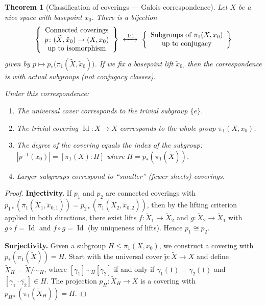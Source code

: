 \documentclass[12pt,a4paper,openany]{book}
\theoremstyle{definition}
\theoremstyle{plain}
\newtheorem{theorem}[definition]{Theorem}
\theoremstyle{remark}
\DeclareMathOperator{\Id}{Id}
\newcommand{\abs}[1]{\left|#1\right|}
\begin{document}
\begin{theorem}[Classification of coverings --- Galois correspondence]\label{thm:galois-correspondence}
  Let $X$ be a nice space with basepoint $x_0$.  There is a bijection
  \[
    \left\{
    \begin{array}{c}
      \text{Connected coverings}\\
      p\colon (\widetilde{X}, \tilde{x}_0) \to (X, x_0)\\
      \text{up to isomorphism}
    \end{array}
    \right\}
    \;\xleftrightarrow{\;1:1\;}\;
    \left\{
    \begin{array}{c}
      \text{Subgroups of } \pi_1(X, x_0)\\
      \text{up to conjugacy}
    \end{array}
    \right\}
  \]
  given by $p \mapsto p_*\big(\pi_1(\widetilde{X}, \tilde{x}_0)\big)$.
  If we fix a basepoint lift $\tilde{x}_0$, then the correspondence is with
  actual subgroups (not conjugacy classes).

  Under this correspondence:
  \begin{enumerate}[label=(\roman*)]
    \item The universal cover corresponds to the trivial subgroup $\{e\}$.
    \item The trivial covering $\Id\colon X \to X$ corresponds to the whole
      group $\pi_1(X, x_0)$.
    \item The degree of the covering equals the index of the subgroup:
      $\abs{p^{-1}(x_0)} = [\pi_1(X) : H]$ where $H = p_*(\pi_1(\widetilde{X}))$.
    \item Larger subgroups correspond to ``smaller'' (fewer sheets) coverings.
  \end{enumerate}
\end{theorem}

\begin{proof}
  \textbf{Injectivity.}  If $p_1$ and $p_2$ are connected coverings with
  $p_{1*}(\pi_1(\widetilde{X}_1, \tilde{x}_{0,1})) =
  p_{2*}(\pi_1(\widetilde{X}_2, \tilde{x}_{0,2}))$, then by the lifting
  criterion applied in both directions, there exist lifts
  $f\colon \widetilde{X}_1 \to \widetilde{X}_2$ and
  $g\colon \widetilde{X}_2 \to \widetilde{X}_1$ with $g \circ f = \Id$ and
  $f \circ g = \Id$ (by uniqueness of lifts).  Hence $p_1 \cong p_2$.

  \textbf{Surjectivity.}  Given a subgroup $H \leq \pi_1(X, x_0)$, we
  construct a covering with $p_*(\pi_1(\widetilde{X})) = H$.  Start with the
  universal cover $\tilde{p}\colon \widetilde{X} \to X$ and define
  $\widetilde{X}_H = \widetilde{X} / {\sim_H}$, where
  $[\gamma_1] \sim_H [\gamma_2]$ if and only if $\gamma_1(1) = \gamma_2(1)$
  and $[\gamma_1 \cdot \overline{\gamma_2}] \in H$.  The projection
  $p_H\colon \widetilde{X}_H \to X$ is a covering with
  $p_{H*}(\pi_1(\widetilde{X}_H)) = H$.
\end{proof}
\end{document}
